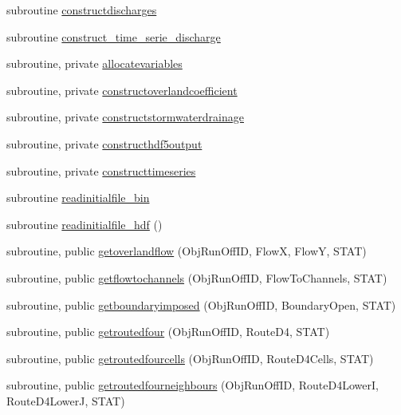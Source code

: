 \begin{DoxyCompactItemize}
\item 
subroutine \mbox{\hyperlink{namespacemodulerunoff_aaa760a0a33dfff4681a831fe25d1b075}{constructdischarges}}
\item 
subroutine \mbox{\hyperlink{namespacemodulerunoff_a7d3fe3f8c8fecb1a73f35d1963f7b2b5}{construct\+\_\+time\+\_\+serie\+\_\+discharge}}
\item 
subroutine, private \mbox{\hyperlink{namespacemodulerunoff_a3a007b7a4dcf19d2d269172e36d996de}{allocatevariables}}
\item 
subroutine, private \mbox{\hyperlink{namespacemodulerunoff_a9750562ffa96a2b097ee6cfb440440ec}{constructoverlandcoefficient}}
\item 
subroutine, private \mbox{\hyperlink{namespacemodulerunoff_a03335615cccffdf4fcbc7979c2e2b299}{constructstormwaterdrainage}}
\item 
subroutine, private \mbox{\hyperlink{namespacemodulerunoff_a2cafb8c9efc342200a6ec558a7eeb90d}{constructhdf5output}}
\item 
subroutine, private \mbox{\hyperlink{namespacemodulerunoff_a38585735a1deed54aec387488350fd0d}{constructtimeseries}}
\item 
subroutine \mbox{\hyperlink{namespacemodulerunoff_abc7533c7bdb5fde4b69ad3d1db1b0b1a}{readinitialfile\+\_\+bin}}
\item 
subroutine \mbox{\hyperlink{namespacemodulerunoff_a0076542117101ad74013563790aca394}{readinitialfile\+\_\+hdf}} ()
\item 
subroutine, public \mbox{\hyperlink{namespacemodulerunoff_a4d5da3ce5f5efddf1d2957ea8e1e1791}{getoverlandflow}} (Obj\+Run\+Off\+ID, FlowX, FlowY, S\+T\+AT)
\item 
subroutine, public \mbox{\hyperlink{namespacemodulerunoff_af164eb766650a303ad4fbe9de7bcb541}{getflowtochannels}} (Obj\+Run\+Off\+ID, Flow\+To\+Channels, S\+T\+AT)
\item 
subroutine, public \mbox{\hyperlink{namespacemodulerunoff_a721381be9f2b0f07b9349c1a1df63001}{getboundaryimposed}} (Obj\+Run\+Off\+ID, Boundary\+Open, S\+T\+AT)
\item 
subroutine, public \mbox{\hyperlink{namespacemodulerunoff_a092094d64e7a0ff361f536ab75f67317}{getroutedfour}} (Obj\+Run\+Off\+ID, Route\+D4, S\+T\+AT)
\item 
subroutine, public \mbox{\hyperlink{namespacemodulerunoff_ad1eea51d0c7cb95a4e235e18dad99861}{getroutedfourcells}} (Obj\+Run\+Off\+ID, Route\+D4\+Cells, S\+T\+AT)
\item 
subroutine, public \mbox{\hyperlink{namespacemodulerunoff_a012d41440fbbe25a6de0417a150502fd}{getroutedfourneighbours}} (Obj\+Run\+Off\+ID, Route\+D4\+LowerI, Route\+D4\+LowerJ, S\+T\+AT)

\end{DoxyCompactItemize}
